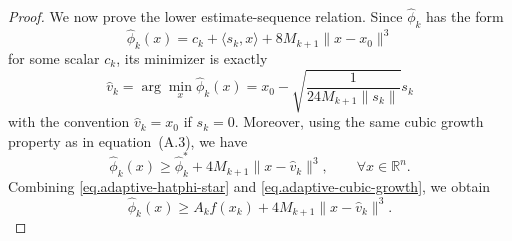 \begin{itemize}
{\begin{proof}
                  We now prove the lower estimate-sequence relation. Since \(\widehat \phi_k\) has the form
                  \[
                      \widehat \phi_k(x)
                      =
                      c_k+\langle s_k,x\rangle+8M_{k+1}\|x-x_0\|^3
                  \]
                  for some scalar \(c_k\), its minimizer is exactly
                  \[
                      \widehat v_k
                      =
                      \arg\min_x \widehat \phi_k(x)
                      =
                      x_0-\sqrt{\frac{1}{24M_{k+1}\|s_k\|}}s_k
                  \]
                  with the convention \(\widehat v_k=x_0\) if \(s_k=0\). Moreover, using the same cubic growth property as in equation~(A.3), we have
                  \begin{equation}
                      \label{eq.adaptive-cubic-growth}
                      \widehat \phi_k(x)
                      \ge
                      \widehat \phi_k^*
                      +
                      4M_{k+1}\|x-\widehat v_k\|^3,
                      \qquad
                      \forall x\in\mathbb R^n.
                  \end{equation}
                  Combining \eqref{eq.adaptive-hatphi-star} and \eqref{eq.adaptive-cubic-growth}, we obtain
                  \begin{equation}
                      \label{eq.adaptive-lower-hatphi}
                      \widehat \phi_k(x)
                      \ge
                      A_k f(x_k)+4M_{k+1}\|x-\widehat v_k\|^3.
                  \end{equation}


\end{proof}}
\end{itemize}
